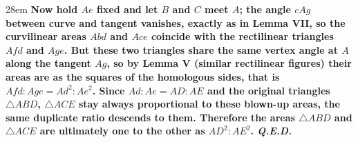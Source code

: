 \documentclass[border=4pt]{standalone}
\begin{document}
\begin{varwidth}{28em}
\large\bfseries
Now hold $Ae$ fixed and let $B$ and $C$ meet $A$; the angle $cAg$ between curve      and tangent vanishes, exactly as in Lemma VII, so the curvilinear areas $Abd$ and $Ace$      coincide with the \textcolor{arearred}{rectilinear triangles $Afd$ and $Age$}. But these two triangles      share the same vertex angle at $A$ along the tangent $Ag$, so by \textcolor{arearred}{Lemma V (similar      rectilinear figures)} their areas are as the squares of the homologous sides, that is      $Afd : Age = Ad^2 : Ae^2$. Since $Ad : Ae = AD : AE$ and the original triangles $\triangle      ABD$, $\triangle ACE$ stay always proportional to these blown-up areas, the same duplicate      ratio descends to them. Therefore the areas $\triangle ABD$ and $\triangle ACE$ are      ultimately one to the other as $AD^2 : AE^2$. \textit{Q.E.D.}
\end{varwidth}
\end{document}

